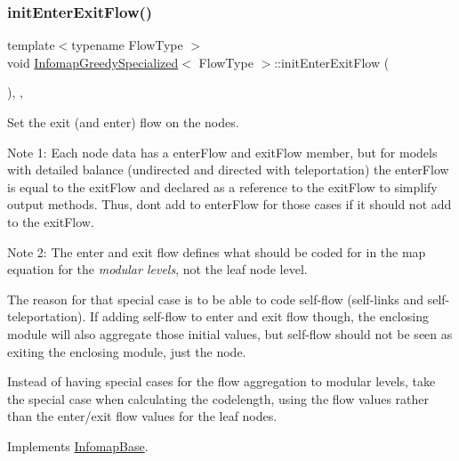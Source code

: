 \subsubsection{\texorpdfstring{init\+Enter\+Exit\+Flow()}{initEnterExitFlow()}\hspace{0.1cm}{\footnotesize\ttfamily [1/2]}}
{\footnotesize\ttfamily template$<$typename Flow\+Type $>$ \\
void \mbox{\hyperlink{classInfomapGreedySpecialized}{Infomap\+Greedy\+Specialized}}$<$ Flow\+Type $>$\+::init\+Enter\+Exit\+Flow (\begin{DoxyParamCaption}{ }\end{DoxyParamCaption})\hspace{0.3cm}{\ttfamily [inline]}, {\ttfamily [protected]}, {\ttfamily [virtual]}}

Set the exit (and enter) flow on the nodes.

Note 1\+: Each node data has a enter\+Flow and exit\+Flow member, but for models with detailed balance (undirected and directed with teleportation) the enter\+Flow is equal to the exit\+Flow and declared as a reference to the exit\+Flow to simplify output methods. Thus, don\textquotesingle{}t add to enter\+Flow for those cases if it should not add to the exit\+Flow.

Note 2\+: The enter and exit flow defines what should be coded for in the map equation for the {\itshape modular levels}, not the leaf node level.

The reason for that special case is to be able to code self-\/flow (self-\/links and self-\/teleportation). If adding self-\/flow to enter and exit flow though, the enclosing module will also aggregate those initial values, but self-\/flow should not be seen as exiting the enclosing module, just the node.

Instead of having special cases for the flow aggregation to modular levels, take the special case when calculating the codelength, using the flow values rather than the enter/exit flow values for the leaf nodes. 

Implements \mbox{\hyperlink{classInfomapBase_a689210ed8f0eaeb767dc1321dfec65f5}{Infomap\+Base}}.


